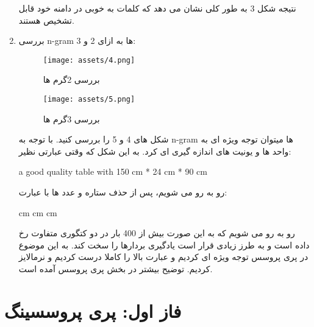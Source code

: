\documentclass[a4paper,12pt]{article}
\begin{document}
\begin{enumerate}
		نتیجه شکل 3 به طور کلی نشان می دهد که کلمات به خوبی در دامنه خود قابل تشخیص هستند.
		
		\item 
		
		بررسی n-gram ها به ازای 2 و 3:
		\begin{figure}[H]
			\centering
			\texttt{[image: assets/4.png]}
			\caption{\textcolor{CustomAccent}{بررسی 2گرم ها}}
		\end{figure}
		
		
		\begin{figure}[H]
			\centering
			\texttt{[image: assets/5.png]}
			\caption{\textcolor{CustomAccent}{بررسی 3گرم ها}}
		\end{figure}
		
		شکل های 4 و 5 را بررسی کنید. با توجه به n-gram ها میتوان توجه ویژه ای به واحد ها و یونیت های اندازه گیری ای کرد. به این شکل که وقتی عبارتی نظیر:
		\begin{latin}
			a good quality table with 150 cm * 24 cm * 90 cm
		\end{latin}
		رو به رو می شویم، پس از حذف ستاره و عدد ها با عبارت:
		\begin{latin}
			cm cm cm 
		\end{latin}
		رو به رو می شویم که به این صورت بیش از 400 بار در دو کتگوری متفاوت رخ داده است و به طرز زیادی قرار است یادگیری بردارها را سخت کند. به این موضوع در پری پروسس توجه ویژه ای کردیم و عبارت بالا را کاملا درست کردیم و نرمالایز کردیم. توضیح بیشتر در بخش پری پروسس آمده است.
		
	\end{enumerate}
	
	\pagebreak
	
	\section{فاز اول: پری پروسسینگ}
	
\end{document}
